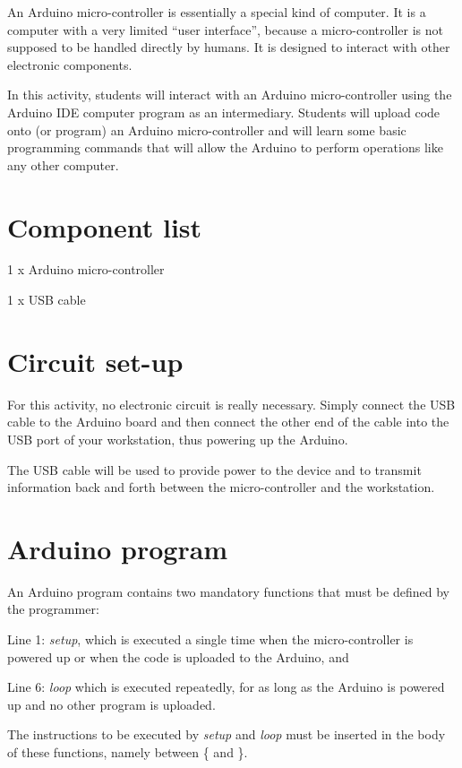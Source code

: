 \documentclass[12pt]{book}
\begin{document}
An Arduino micro-controller is essentially a special kind of
computer. It is a computer with a very limited ``user
interface'', because a micro-controller is not supposed to be
handled directly by humans. It is designed to interact with other
electronic components.

In this activity, students will interact with an Arduino
micro-controller using the Arduino IDE computer program as an
intermediary. Students will upload code onto (or program) an Arduino
  micro-controller and will learn some basic programming commands that
  will allow the Arduino to perform operations like any other
  computer.

\section{Component list}
\begin{compactitem}[--]
  \item 1 x Arduino micro-controller
  \item 1 x USB cable
\end{compactitem}


\section{Circuit set-up}\label{se:setup0}

For this activity, no electronic circuit is really necessary. Simply
connect the USB cable to the Arduino board and then connect the other
end of the cable into the USB port of your workstation, thus powering
up the Arduino.

The USB cable will be used to provide power to the device and to
transmit information back and forth between the micro-controller
and the workstation. 

\section{Arduino program}

An Arduino program contains two mandatory functions that must be
defined by the programmer: 
\begin{inparaenum}[(1)]
\item Line 1: \emph{setup}, which is executed a single time when the
micro-controller is powered up or when the code is uploaded to the
Arduino, and 
\item Line 6: \emph{loop} which is executed repeatedly, for as long as the
Arduino is powered up and no other program is uploaded.
\end{inparaenum}
The instructions to be executed by \emph{setup} and \emph{loop} must
be inserted in the body of these functions, namely between \{ and \}. 
\end{document}
